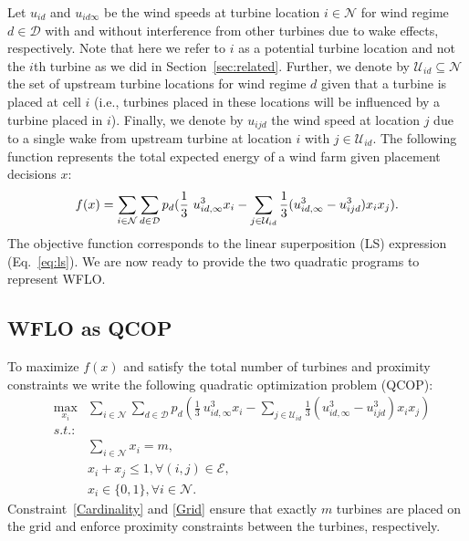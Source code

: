 \documentclass[preprint,12pt]{elsarticle}
\begin{document}
Let $u_{id}$ and $u_{id\infty}$ 
be the wind speeds at turbine location $i \in \mathcal{N}$ for wind regime $d \in \mathcal{D}$
with and without interference from other turbines due to wake effects, respectively. 
Note that here we refer to $i$ as a potential turbine location and not the $i$th turbine as we did in Section~\ref{sec:related}.
Further, we denote by $\mathcal{U}_{id} \subseteq \mathcal{N}$ 
the set of upstream 
turbine locations for wind regime $d$
given that a turbine is placed at cell $i$ (i.e., turbines placed in these locations 
will be influenced by a turbine placed in $i$). Finally,
we denote by $u_{ijd}$ the wind speed at location $j$ due to a single wake from upstream turbine at location $i$ with $j \in \mathcal{U}_{id}$. 
The following function  
represents the total expected energy of a wind farm given placement decisions 
$x$: \begin{equation}
f(x) = \sum_{i \in \mathcal{N}}^{} \sum_{d \in \mathcal{D}}^{} p_d ( \frac{1}{3} \ u_{id, \infty}^3 x_i  - \sum_{j \in \mathcal{U}_{id}}^{} \frac{1}{3}(u_{id, \infty} ^3 - u_{ijd}^3)x_i x_j).   \label{ObjFunc}\\
\end{equation} The objective function corresponds to the linear superposition (LS)
expression (Eq.~\ref{eq:ls}). We are now ready to provide the two quadratic programs to represent WFLO.

\subsection{WFLO as QCOP}

To 
maximize $f(x)$ and satisfy the total number of turbines and proximity 
constraints we write
the following quadratic optimization problem (QCOP):
\begin{eqnarray} \label{QCOP}
&\max_{x_i}^{}& \sum_{i \in \mathcal{N}}^{} \sum_{d \in \mathcal{D}}^{} p_d ( \frac{1}{3} \ u_{id, \infty}^3 x_i  - \sum_{j \in \mathcal{U}_{id}}^{} \frac{1}{3}(u_{id, \infty} ^3 - u_{ijd}^3)x_i x_j)   \\
&s.t.:& \nonumber\\
&\mbox{       }& \sum_{i \in \mathcal{N}}^{} x_i = m,\label{Cardinality}\\
&\mbox{       }& x_i + x_j \leq 1,   \forall (i,j) \in \mathcal{E}, \label{Grid}\\
&\mbox{       }& x_i \in \{0,1\},     \forall i \in \mathcal{N}.
\end{eqnarray} Constraint~\ref{Cardinality} and \ref{Grid} ensure that exactly $m$ turbines are placed on the grid
and enforce proximity constraints between the turbines, respectively. 
\end{document}
